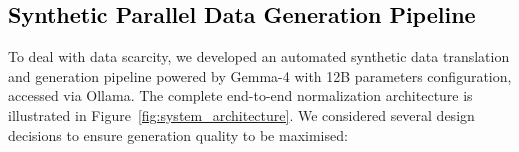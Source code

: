 \documentclass[11pt, a4paper]{article}
\begin{document}
\color{black}

\subsection{\textcolor{black}{Synthetic Parallel Data Generation Pipeline}}

To deal with data scarcity, we developed an automated synthetic data translation and generation pipeline powered by Gemma-4 \citep{gemma2024} with 12B parameters configuration, accessed via Ollama. The complete end-to-end normalization architecture is illustrated in Figure~\ref{fig:system_architecture}. We considered several design decisions to ensure generation quality to be maximised:
\end{document}
